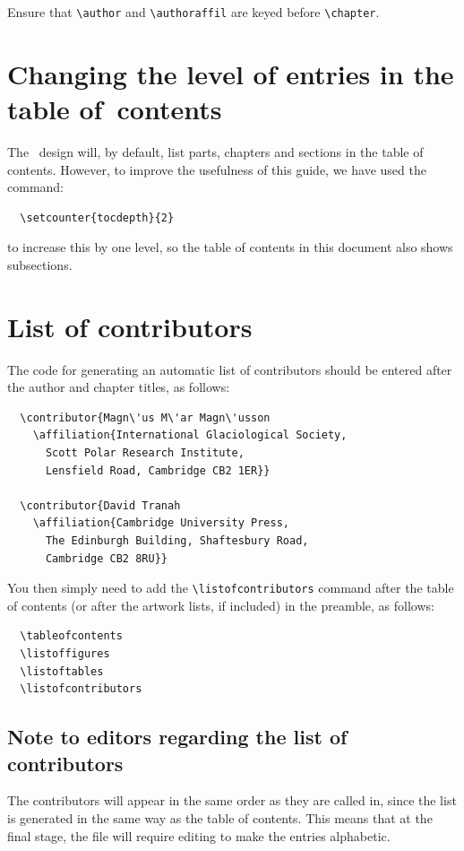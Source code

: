Ensure that \verb"\author" and \verb"\authoraffil" are keyed before \verb"\chapter".

\section{Changing the level of entries in the table of~contents}
\label{changingentries}
The \cambridge\ design will, by default, list parts, chapters and sections in the table of contents. However, to improve the usefulness of this guide, we have used the command:
\begin{verbatim}
  \setcounter{tocdepth}{2}
\end{verbatim}
to increase this by one level, so the table of contents in this document also shows subsections.

\section{List of contributors}
\label{contrib}
The code for generating an automatic list of contributors should be entered after the author and chapter titles, as follows:
\begin{verbatim}
  \contributor{Magn\'us M\'ar Magn\'usson
    \affiliation{International Glaciological Society,
      Scott Polar Research Institute,
      Lensfield Road, Cambridge CB2 1ER}}

  \contributor{David Tranah
    \affiliation{Cambridge University Press,
      The Edinburgh Building, Shaftesbury Road,
      Cambridge CB2 8RU}}
\end{verbatim}
You then simply need to add the \verb"\listofcontributors" command after the table of contents (or after the artwork lists, if included) in the preamble, as follows:
\begin{verbatim}
  \tableofcontents
  \listoffigures
  \listoftables
  \listofcontributors
\end{verbatim}

\subsection{Note to editors regarding the list of contributors}

The contributors will appear in the same order as they are called in, since the list is generated in the same way as the table of contents. This means that at the final stage, the file will require editing to make the entries alphabetic.


